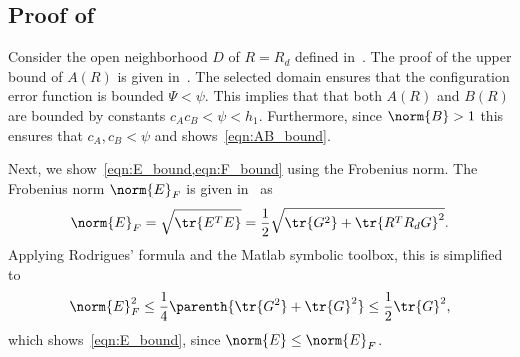 \subsection{Proof of~}\label{proof:eR_dot_bound}


Consider the open neighborhood $D$ of $R=R_d$ defined in~.
The proof of the upper bound of \( A(R) \) is given in~\cite{LeeITCST13}.
The selected domain ensures that the configuration error function is bounded \( \Psi < \psi \).
This implies that that both \( A(R) \) and \( B(R) \) are bounded by constants \( c_A c_B < \psi < h_1\).
Furthermore, since \( \norm{B} > 1 \) this ensures that \( c_A, c_B < \psi\) and shows~\cref{eqn:AB_bound}.

Next, we show~\cref{eqn:E_bound,eqn:F_bound} using the Frobenius norm.
The Frobenius norm \( \norm{E}_F \) is given in~\cite{LeeITCST13} as
\begin{gather*}
	\norm{E}_F = \sqrt{\tr{E^T E}} = \frac{1}{2} \sqrt{\tr{G^2} + \tr{R^T R_d G}^2} .
\end{gather*}
Applying Rodrigues' formula and the Matlab symbolic toolbox, this is simplified to
\begin{gather*}
	\norm{E}^2_F \leq \frac{1}{4} \parenth{\tr{G^2} + \tr{G}^2} \leq \frac{1}{2} \tr{G}^2 ,
\end{gather*}
which shows~\cref{eqn:E_bound}, since \( \norm{E} \leq \norm{E}_F \).

